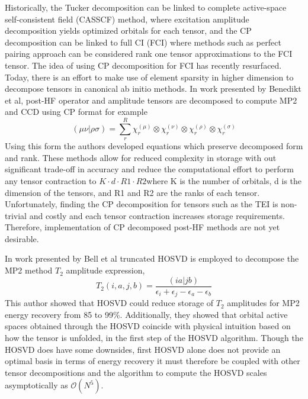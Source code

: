 	  Historically, the Tucker decomposition can be linked to complete active-space self-consistent field (CASSCF) method\cite{Roos 1980}, where excitation amplitude decomposition yields optimized orbitals for each tensor, and the CP decomposition can be linked to full CI\cite{Bell 2010} (FCI) where methods such as perfect pairing approach can be considered rank one tensor approximations to the FCI tensor. The idea of using CP decomposition for FCI has recently resurfaced\cite{Uemura 2012, Bohm 2016}. Today, there is an effort to make use of element sparsity in higher dimension to decompose tensors in canonical ab initio methods. In work presented by Benedikt et al\cite{Benedikt 2011, Benedikt 2013, Benedikt 2014}, post-HF operator and amplitude tensors are decomposed to compute MP2 and CCD using CP format for example
	  	\begin{equation}
	  		(\mu\nu|\rho\sigma) = \sum_r^R \chi^{(\mu)}_r \otimes \chi^{(\nu)}_r \otimes \chi^{(\rho)}_r \otimes \chi^{(\sigma)}_r
	  	\end{equation}
	  Using this form the authors developed equations which preserve decomposed form and rank.  These methods allow for reduced complexity in storage with out significant trade-off in accuracy and reduce the computational effort to perform any tensor contraction to $K \cdot d \cdot R1 \cdot R2$where K is the number of orbitals, d is the dimension of the tensors, and R1 and R2 are the ranks of each tensor. Unfortunately, finding the CP decomposition for tensors such as the TEI is non-trivial and costly and each tensor contraction increases storage requirements. Therefore, implementation of CP decomposed post-HF methods are not yet desirable.

	  In work presented by Bell et al\cite{Bell 2010} truncated HOSVD is employed to decompose the MP2 method $T_2$ amplitude expression, 
	  	\begin{equation}
	  		T_2(i,a,j,b) = \frac{(ia|jb)}{\epsilon_i + \epsilon_j - \epsilon_a - \epsilon_b}
	  	\end{equation}
	  This author showed that HOSVD could reduce storage of $T_2$ amplitudes for MP2 energy recovery from 85 to 99\%.  Additionally, they showed that orbital active spaces obtained through the HOSVD coincide with physical intuition based on how the tensor is unfolded, in the first step of the HOSVD algorithm.  Though the HOSVD does have some downsides, first HOSVD alone does not provide an optimal basis in terms of energy recovery it must therefore be coupled with other tensor decompositions and the algorithm to compute the HOSVD scales asymptotically as $\mathcal{O}(N^5)$\cite{Bell 2010}.

